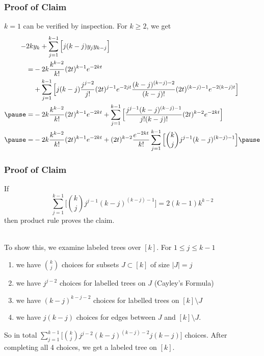 \documentclass{beamer}
\begin{document}
\begin{frame}
  \frametitle{Proof of Claim}
  \(k = 1\) can be verified by inspection. \pause For \(k \geq 2\), we get
    \[
      \begin{aligned}
        -2 k &y_{k} + \sum\limits_{j=1}^{k-1} \Big[ j (k - j) y_{j}y_{k-j}\Big] \\
        = &-2 k \frac{k^{k-2}}{k!}(2t)^{k-1} e^{-2kt} \\
        &+ \sum\limits_{j=1}^{k-1} \Big[ j (k - j) \frac{j^{j-2}}{j!}(2t)^{j-1} e^{-2jt} \frac{(k-j)^{(k-j)-2}}{(k-j)!}(2t)^{(k-j)-1} e^{-2(k-j)t}\Big] \\ \pause 
        = &-2 k \frac{k^{k-2}}{k!}(2t)^{k-1} e^{-2kt} + \sum\limits_{j=1}^{k-1} \Big[  \frac{j^{j-1}(k-j)^{(k-j)-1} }{j!(k-j)!}(2t)^{k-2} e^{-2kt}\Big] \\ \pause
        = &-2 k \frac{k^{k-2}}{k!}(2t)^{k-1} e^{-2kt} + (2t)^{k-2} \frac{e^{-2kt}}{k!} \sum\limits_{j=1}^{k-1} \Big[ \binom{k}{j} j^{j-1}(k-j)^{(k-j)-1}\Big] \pause
    \end{aligned}
  \]
  
\end{frame}

\begin{frame}
  \frametitle{Proof of Claim}
  If
    \[\sum\limits_{j=1}^{k-1} \Big[ \binom{k}{j} j^{j-1}(k-j)^{(k-j)-1}\Big] = 2(k-1)k^{k-2}\]
  then product rule proves the claim. \\~\ \pause

  To show this, we examine labeled trees over \([k]\). \pause For \(1 \leq  j \leq k-1\)
  \begin{enumerate}
      \item we have \(\binom{k}{j}\) choices for subsets \(J \subset [k]\) of size \(|J| = j\) \pause
      \item we have \(j^{j-2}\) choices for labelled trees on \(J\) (Cayley's Formula) \pause
      \item we have \((k-j)^{k-j-2}\) choices for labelled trees on \([k] \setminus J\) \pause
      \item we have \(j(k-j)\) choices for edges between \(J\) and \([k] \setminus J\). \pause
  \end{enumerate}

  So in total \(\sum\limits_{j=1}^{k-1} \Big[ \binom{k}{j} j^{j-2}(k-j)^{(k-j)-2} j(k-j)\Big]\) choices. After completing all 4 choices, we get a labeled tree on \([k]\).
  
\end{frame}
\end{document}

